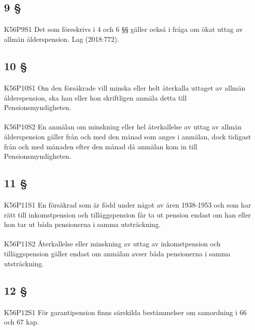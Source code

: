\documentclass[a4paper,notitlepage,openany,10pt]{book}
\begin{document}
\subsection*{9 §}
\paragraph*{}
{\tiny K56P9S1}
Det som föreskrivs i 4 och 6 §§ gäller också i fråga om ökat uttag av allmän ålderspension.
Lag (2018:772).
\subsection*{10 §}
\paragraph*{}
{\tiny K56P10S1}
Om den försäkrade vill minska eller helt återkalla uttaget av allmän ålderspension, ska han eller hon skriftligen anmäla detta till Pensionsmyndigheten.
\paragraph*{}
{\tiny K56P10S2}
En anmälan om minskning eller hel återkallelse av uttag av allmän ålderspension gäller från och med den månad som anges i anmälan, dock tidigast från och med månaden efter den månad då anmälan kom in till Pensionsmyndigheten.
\subsection*{11 §}
\paragraph*{}
{\tiny K56P11S1}
En försäkrad som är född under något av åren 1938-1953 och som har rätt till inkomstpension och tilläggspension får ta ut pension endast om han eller hon tar ut båda pensionerna i samma utsträckning.
\paragraph*{}
{\tiny K56P11S2}
Återkallelse eller minskning av uttag av inkomstpension och tilläggspension gäller endast om anmälan avser båda pensionerna i samma utsträckning.
\subsection*{12 §}
\paragraph*{}
{\tiny K56P12S1}
För garantipension finns särskilda bestämmelser om samordning i 66 och 67 kap.
\end{document}
